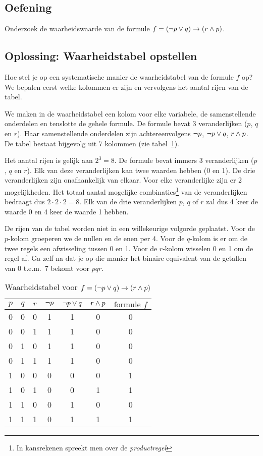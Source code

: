 \subsection{Oefening}
Onderzoek de waarheidswaarde van de formule $f = (\neg p \vee q) \rightarrow (r \wedge p)$.\\

\subsection*{Oplossing: Waarheidstabel opstellen}
Hoe stel je op een systematische manier de waarheidstabel van de formule $f$ op? We bepalen eerst welke kolommen er zijn en vervolgens het aantal rijen van de tabel.

We maken in de waarheidstabel een kolom voor elke variabele, de samenstellende onderdelen en tenslotte de gehele formule. De formule bevat 3 veranderlijken ($p$, $q$ en $r$). Haar samenstellende onderdelen zijn achtereenvolgens $\neg p$, $\neg p \vee q$, $r \wedge p$. De tabel bestaat bijgevolg uit 7 kolommen (zie tabel~\ref{tbl:oefdrievar}).

Het aantal rijen is gelijk aan $2^3=8$.  De formule bevat immers 3 veranderlijken ($p$, $q$ en $r$). Elk van deze veranderlijken kan twee waarden hebben (0 en 1). De drie veranderlijken zijn onafhankelijk van elkaar. Voor elke veranderlijke zijn er 2 mogelijkheden. Het totaal aantal mogelijke combinaties\footnote{In kansrekenen spreekt men over de \emph{productregel}} van de veranderlijken bedraagt dus $2 \cdot 2 \cdot 2 = 8$. Elk van de drie veranderlijken $p$, $q$ of $r$ zal dus 4 keer de waarde 0 en 4 keer de waarde 1 hebben.

De rijen van de tabel worden niet in een willekeurige volgorde geplaatst. Voor de $p$-kolom groeperen we de nullen en de enen per 4. Voor de $q$-kolom is er om de twee regels een afwisseling tussen 0 en 1. Voor de $r$-kolom wisselen 0 en 1 om de regel af. Ga zelf na dat je op die manier het binaire equivalent van de getallen van 0 t.e.m.\ 7 bekomt voor $pqr$.
\begin{table}[htb]
  \centering
  \caption{Waarheidstabel voor $f=(\neg p \vee q) \rightarrow (r \wedge p)$}\label{tbl:oefdrievar}
\begin{tabular}{ccccccc}
\toprule
 $p$  & $q$ & $r$ & $\neg p$ & $\neg p \vee q$ & $r \wedge p$ & $\mbox{formule } f$ \\
\midrule
0 & 0 & 0 & 1 & 1 & 0 & 0 \\
0 & 0 & 1 & 1 & 1 & 0 & 0 \\
0 & 1 & 0 & 1 & 1 & 0 & 0 \\
0 & 1 & 1 & 1 & 1 & 0 & 0 \\
1 & 0 & 0 & 0 & 0 & 0 & 1 \\
1 & 0 & 1 & 0 & 0 & 1 & 1 \\
1 & 1 & 0 & 0 & 1 & 0 & 0 \\
1 & 1 & 1 & 0 & 1 & 1 & 1 \\
\bottomrule
\end{tabular}
\end{table}

